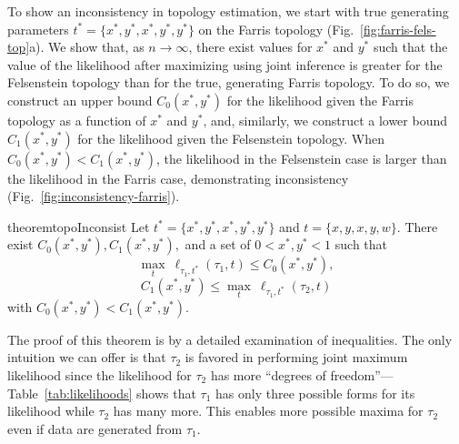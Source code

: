 \documentclass{article}
\newcommand{\nCols}{n}
\begin{document}
To show an inconsistency in topology estimation, we start with true generating parameters $t^*=\{x^*, y^*, x^*, y^*, y^*\}$ on the Farris topology (Fig.~\ref{fig:farris-fels-top}a).
We show that, as $\nCols\rightarrow\infty$, there exist values for $x^*$ and $y^*$ such that the value of the likelihood after maximizing using joint inference is greater for the Felsenstein topology than for the true, generating Farris topology.
To do so, we construct an upper bound $C_0(x^*, y^*)$ for the likelihood given the Farris topology as a function of $x^*$ and $y^*$, and, similarly, we construct a lower bound $C_1(x^*, y^*)$ for the likelihood given the Felsenstein topology.
When $C_0(x^*, y^*) < C_1(x^*, y^*)$, the likelihood in the Felsenstein case is larger than the likelihood in the Farris case, demonstrating inconsistency (Fig.~\ref{fig:inconsistency-farris}).
\begin{restatable}{theorem}{topoInconsist}
Let $t^*=\{x^*, y^*, x^*, y^*, y^*\}$ and $t=\{x, y, x, y, w\}$.
There exist $C_0(x^*, y^*), C_1(x^*, y^*),$ and a set of $0 < x^*, y^* < 1$ such that
$$
\max_{t} \ \ell_{\tau_1,t^*}(\tau_1, t) \le C_0(x^*, y^*),
$$
$$
C_1(x^*, y^*) \le \max_{t} \ \ell_{\tau_1,t^*}(\tau_2, t)
$$
with $C_0(x^*, y^*) < C_1(x^*, y^*)$.
\end{restatable}
The proof of this theorem is by a detailed examination of inequalities.
The only intuition we can offer is that $\tau_2$ is favored in performing joint maximum likelihood since the likelihood for $\tau_2$ has more ``degrees of freedom''---Table~\ref{tab:likelihoods} shows that $\tau_1$ has only three possible forms for its likelihood while $\tau_2$ has many more.
This enables more possible maxima for $\tau_2$ even if data are generated from $\tau_1$.
\end{document}
